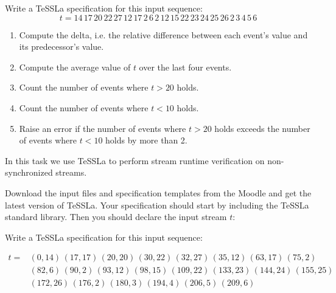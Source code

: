 \documentclass[language=en,sheet=7,prefix]{exercise}
\begin{document}


Write a TeSSLa specification for this input sequence:
\[ t = 14\, 17\, 20\, 22\, 27\, 12\, 17\, 2\, 6\, 2\, 12\, 15\, 22\, 23\, 24\, 25\, 26\, 2\, 3\, 4\, 5\, 6 \]

\begin{enumerate}
  \item Compute the delta, i.e. the relative difference between each event's value and its predecessor's value.
  \item Compute the average value of $t$ over the last four events.
  \item Count the number of events where $t>20$ holds.
  \item Count the number of events where $t<10$ holds.
  \item Raise an error if the number of events where $t>20$ holds exceeds the number of events where $t<10$ holds by more than 2.
\end{enumerate}

\begin{solution}
  
\end{solution}


In this task we use TeSSLa to perform stream runtime verification on non-synchronized streams.

Download the input files and specification templates from the Moodle and get the latest version of TeSSLa\footnotemark[1].
Your specification should start by including the TeSSLa standard library. Then you should declare the input stream $t$:



Write a TeSSLa specification for this input sequence:

\begin{align}
  t = & (0,14)\, (17,17)\, (20,20)\, (30,22)\, (32,27)\, (35,12)\, (63,17)\, (75,2)\\
      & (82,6)\, (90,2)\, (93,12)\, (98,15)\, (109,22)\, (133,23)\, (144,24)\, (155,25)\\
      & (172,26)\, (176,2)\, (180,3)\, (194,4)\, (206,5)\, (209,6)
\end{align}
\end{document}
